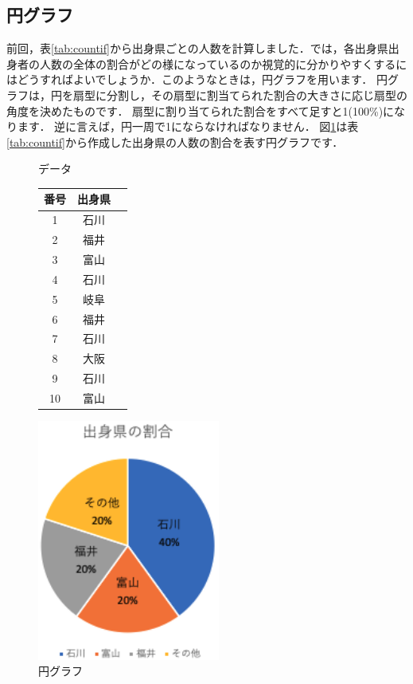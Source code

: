\subsection{円グラフ}

前回，表\ref{tab:countif}から出身県ごとの人数を計算しました．では，各出身県出身者の人数の全体の割合がどの様になっているのか視覚的に分かりやすくするにはどうすればよいでしょうか．このようなときは，円グラフを用います．
円グラフは，円を扇型に分割し，その扇型に割当てられた割合の大きさに応じ扇型の角度を決めたものです．
扇型に割り当てられた割合をすべて足すと1(100\%)になります．
逆に言えば，円一周で1にならなければなりません．
図\ref{fig:piechart}は表\ref{tab:countif}から作成した出身県の人数の割合を表す円グラフです．

\begin{figure}
\begin{minipage}{0.5\hsize}
    \centering
    \makeatletter
    \def\@captype{table}
    \makeatother
    \caption{データ}
    \begin{tabular}{|c|c|c|}
      \hline
      番号& 出身県\\ \hline
      1   & 石川  \\ \hline
      2   & 福井  \\ \hline
      3   & 富山  \\ \hline
      4   & 石川  \\ \hline
      5   & 岐阜  \\ \hline
      6   & 福井  \\ \hline
      7   & 石川  \\ \hline
      8   & 大阪  \\ \hline
      9   & 石川  \\ \hline
      10  & 富山  \\ \hline
    \end{tabular}
    \label{tab:countif}
\end{minipage}
\begin{minipage}{0.5\hsize}
    \centering
    \includegraphics[width=6cm]{chap2/piechart.png}
    \caption{円グラフ}
    \label{fig:piechart}
\end{minipage}
\end{figure}



